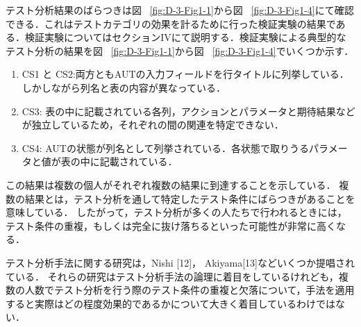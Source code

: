 \documentclass[a4paper,12pt]{jreport}
\begin{document}
テスト分析結果のばらつきは図 ~\ref{fig:D-3-Fig1-1}から図 ~\ref{fig:D-3-Fig1-4}にて確認できる．これはテストカテゴリの効果を計るために行った検証実験の結果である．検証実験についてはセクションIVにて説明する．検証実験による典型的なテスト分析の結果を図 ~\ref{fig:D-3-Fig1-1}から図 ~\ref{fig:D-3-Fig1-4}でいくつか示す．
\begin{enumerate}
\item CS1 と CS2:両方ともAUTの入力フィールドを行タイトルに列挙している．しかしながら列名と表の内容が異なっている．
\item CS3: 表の中に記載されている各列，アクションとパラメータと期待結果などが独立しているため，それぞれの間の関連を特定できない．
\item CS4: AUTの状態が列名として列挙されている．各状態で取りうるパラメータと値が表の中に記載されている．
\end{enumerate}

この結果は複数の個人がそれぞれ複数の結果に到達することを示している．
複数の結果とは，テスト分析を通して特定したテスト条件にばらつきがあることを意味している．
したがって，テスト分析が多くの人たちで行われるときには，テスト条件の重複，もしくは完全に抜け落ちるといった可能性が非常に高くなる．



テスト分析手法に関する研究は，Nishi [12]， Akiyama[13]などいくつか提唱されている．
それらの研究はテスト分析手法の論理に着目をしているけれども，複数の人数でテスト分析を行う際のテスト条件の重複と欠落について，手法を適用すると実際はどの程度効果的であるかについて大きく着目しているわけではない．
\end{document}
